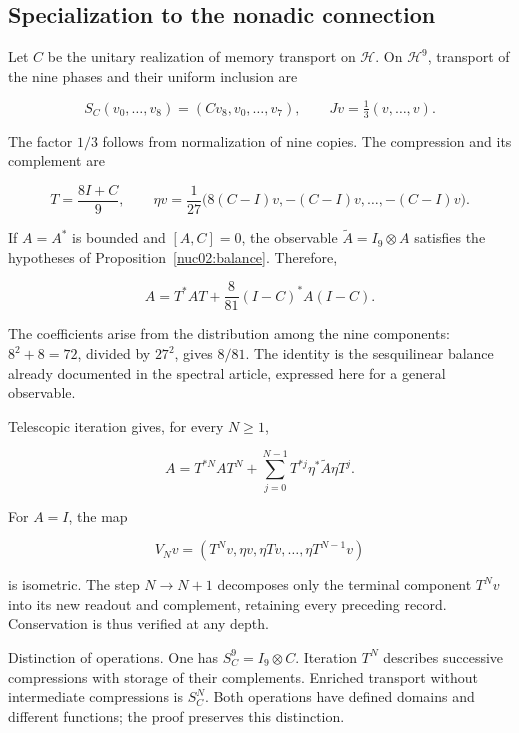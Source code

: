 \subsection{Specialization to the nonadic connection}

Let \(C\) be the unitary realization of memory transport on \(\mathcal H\). On \(\mathcal H^9\), transport of the nine phases and their uniform inclusion are

\[
S_C(v_0,\ldots,v_8)=(Cv_8,v_0,\ldots,v_7),
\qquad Jv=\tfrac13(v,\ldots,v).
\]

The factor \(1/3\) follows from normalization of nine copies. The compression and its complement are

\[
T=\frac{8I+C}{9},\qquad
\eta v=\frac1{27}\bigl(8(C-I)v,-(C-I)v,\ldots,-(C-I)v\bigr).
\]

If \(A=A^*\) is bounded and \([A,C]=0\), the observable \(\widetilde A=I_9\otimes A\) satisfies the hypotheses of Proposition~\ref{nuc02:balance}. Therefore,

\begin{equation}
\boxed{A=T^*AT+\frac8{81}(I-C)^*A(I-C).}\label{nuc02:eq:2}
\end{equation}

The coefficients arise from the distribution among the nine components: \(8^2+8=72\), divided by \(27^2\), gives \(8/81\). The identity is the sesquilinear balance already documented in the spectral article, expressed here for a general observable.

Telescopic iteration gives, for every \(N\geq1\),

\begin{equation}
A=T^{*N}AT^N+
\sum_{j=0}^{N-1}T^{*j}\eta^*\widetilde A\eta T^j.\label{nuc02:eq:3}
\end{equation}

For \(A=I\), the map

\[
V_Nv=(T^Nv,\eta v,\eta Tv,\ldots,\eta T^{N-1}v)
\]

is isometric. The step \(N\to N+1\) decomposes only the terminal component \(T^Nv\) into its new readout and complement, retaining every preceding record. Conservation is thus verified at any depth.

Distinction of operations. One has \(S_C^9=I_9\otimes C\). Iteration \(T^N\) describes successive compressions with storage of their complements. Enriched transport without intermediate compressions is \(S_C^N\). Both operations have defined domains and different functions; the proof preserves this distinction.

